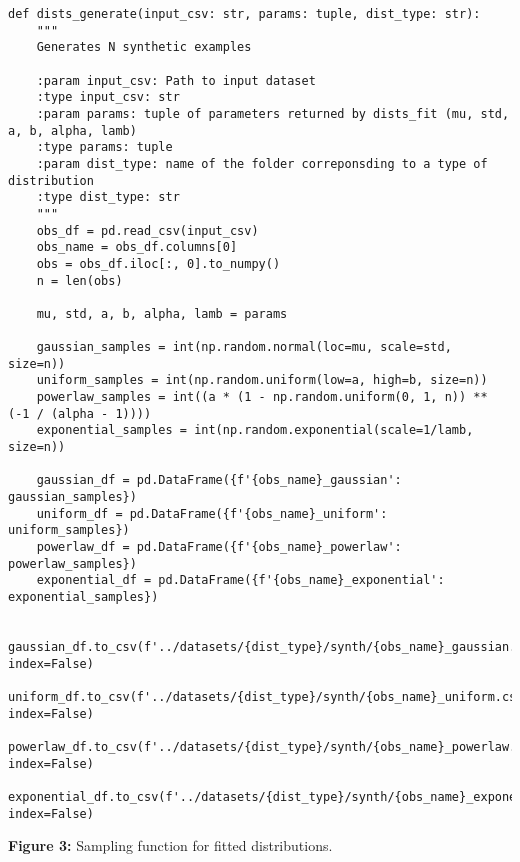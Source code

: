 \begin{verbatim}
def dists_generate(input_csv: str, params: tuple, dist_type: str):
    """
    Generates N synthetic examples

    :param input_csv: Path to input dataset
    :type input_csv: str
    :param params: tuple of parameters returned by dists_fit (mu, std, a, b, alpha, lamb)
    :type params: tuple
    :param dist_type: name of the folder correponsding to a type of distribution
    :type dist_type: str
    """
    obs_df = pd.read_csv(input_csv)
    obs_name = obs_df.columns[0]
    obs = obs_df.iloc[:, 0].to_numpy()
    n = len(obs)

    mu, std, a, b, alpha, lamb = params

    gaussian_samples = int(np.random.normal(loc=mu, scale=std, size=n))
    uniform_samples = int(np.random.uniform(low=a, high=b, size=n))
    powerlaw_samples = int((a * (1 - np.random.uniform(0, 1, n)) ** (-1 / (alpha - 1))))
    exponential_samples = int(np.random.exponential(scale=1/lamb, size=n))

    gaussian_df = pd.DataFrame({f'{obs_name}_gaussian': gaussian_samples})
    uniform_df = pd.DataFrame({f'{obs_name}_uniform': uniform_samples})
    powerlaw_df = pd.DataFrame({f'{obs_name}_powerlaw': powerlaw_samples})
    exponential_df = pd.DataFrame({f'{obs_name}_exponential': exponential_samples})
    
    gaussian_df.to_csv(f'../datasets/{dist_type}/synth/{obs_name}_gaussian.csv', index=False)
    uniform_df.to_csv(f'../datasets/{dist_type}/synth/{obs_name}_uniform.csv', index=False) 
    powerlaw_df.to_csv(f'../datasets/{dist_type}/synth/{obs_name}_powerlaw.csv', index=False)
    exponential_df.to_csv(f'../datasets/{dist_type}/synth/{obs_name}_exponential.csv', index=False)
\end{verbatim}

\begin{center}
\textbf{Figure 3:} Sampling function for fitted distributions.
\end{center}



\newpage
